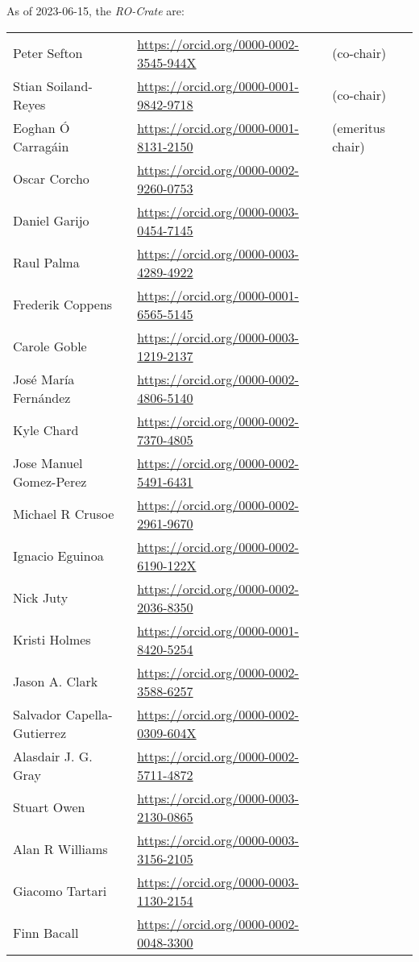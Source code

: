 As of 2023-06-15, the \emph{RO-Crate}  are:

\begin{longtable}{lll}
  Peter Sefton & \url{https://orcid.org/0000-0002-3545-944X} & (co-chair) 
\\
  Stian Soiland-Reyes & \url{https://orcid.org/0000-0001-9842-9718} & (co-chair) 
\\
  Eoghan Ó Carragáin & \url{https://orcid.org/0000-0001-8131-2150} & (emeritus chair) 
\\
  Oscar Corcho & \url{https://orcid.org/0000-0002-9260-0753}
\\
  Daniel Garijo & \url{https://orcid.org/0000-0003-0454-7145}
\\
  Raul Palma & \url{https://orcid.org/0000-0003-4289-4922}
\\
  Frederik Coppens & \url{https://orcid.org/0000-0001-6565-5145}
\\
  Carole Goble & \url{https://orcid.org/0000-0003-1219-2137}
\\
  José María Fernández & \url{https://orcid.org/0000-0002-4806-5140}
\\
  Kyle Chard & \url{https://orcid.org/0000-0002-7370-4805}
\\
  Jose Manuel Gomez-Perez & \url{https://orcid.org/0000-0002-5491-6431}
\\
  Michael R Crusoe & \url{https://orcid.org/0000-0002-2961-9670}
\\
  Ignacio Eguinoa & \url{https://orcid.org/0000-0002-6190-122X}
\\
  Nick Juty & \url{https://orcid.org/0000-0002-2036-8350}
\\
  Kristi Holmes & \url{https://orcid.org/0000-0001-8420-5254}
\\
  Jason A. Clark & \url{https://orcid.org/0000-0002-3588-6257}
\\
  Salvador Capella-Gutierrez & \url{https://orcid.org/0000-0002-0309-604X}
\\
  Alasdair J. G. Gray & \url{https://orcid.org/0000-0002-5711-4872}
\\
  Stuart Owen & \url{https://orcid.org/0000-0003-2130-0865}
\\
  Alan R Williams & \url{https://orcid.org/0000-0003-3156-2105}
\\
  Giacomo Tartari & \url{https://orcid.org/0000-0003-1130-2154}
\\
  Finn Bacall & \url{https://orcid.org/0000-0002-0048-3300}
\\

\end{longtable}
